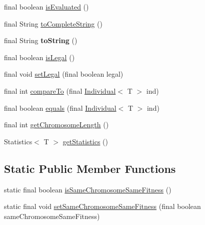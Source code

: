 \begin{DoxyCompactItemize}
\item 
final boolean \hyperlink{classjenes_1_1population_1_1_individual_3_01_t_01extends_01_chromosome_01_4_a90f222f30e37b23c0c3aceffd4571cfa}{is\-Evaluated} ()
\item 
final String \hyperlink{classjenes_1_1population_1_1_individual_3_01_t_01extends_01_chromosome_01_4_aeea71cba0872f34f4097e882b5debf64}{to\-Complete\-String} ()
\item 
\hypertarget{classjenes_1_1population_1_1_individual_3_01_t_01extends_01_chromosome_01_4_a705d4c4407ca6e33ae5b500fb192ced0}{final String {\bfseries to\-String} ()}\label{classjenes_1_1population_1_1_individual_3_01_t_01extends_01_chromosome_01_4_a705d4c4407ca6e33ae5b500fb192ced0}

\item 
final boolean \hyperlink{classjenes_1_1population_1_1_individual_3_01_t_01extends_01_chromosome_01_4_adcfca83cfc369ef8a3fcabe9bda4de1f}{is\-Legal} ()
\item 
final void \hyperlink{classjenes_1_1population_1_1_individual_3_01_t_01extends_01_chromosome_01_4_aabb4dbbc582544a12932ec7c42a2ec78}{set\-Legal} (final boolean legal)
\item 
final int \hyperlink{classjenes_1_1population_1_1_individual_3_01_t_01extends_01_chromosome_01_4_a4cc0f0feb3da7cc54bb44e881006d39a}{compare\-To} (final \hyperlink{classjenes_1_1population_1_1_individual_3_01_t_01extends_01_chromosome_01_4_aaef7161bf62cee0ac95f079394fdac9f}{Individual}$<$ T $>$ ind)
\item 
final boolean \hyperlink{classjenes_1_1population_1_1_individual_3_01_t_01extends_01_chromosome_01_4_acffe4b1590048fb780b637716fad6db6}{equals} (final \hyperlink{classjenes_1_1population_1_1_individual_3_01_t_01extends_01_chromosome_01_4_aaef7161bf62cee0ac95f079394fdac9f}{Individual}$<$ T $>$ ind)
\item 
final int \hyperlink{classjenes_1_1population_1_1_individual_3_01_t_01extends_01_chromosome_01_4_a78847299c79de4cde6aec341a406e80c}{get\-Chromosome\-Length} ()
\item 
Statistics$<$ T $>$ \hyperlink{classjenes_1_1population_1_1_individual_3_01_t_01extends_01_chromosome_01_4_acdf2d55195f6068913e5487b0542952a}{get\-Statistics} ()
\end{DoxyCompactItemize}
\subsection*{Static Public Member Functions}
\begin{DoxyCompactItemize}
\item 
static final boolean \hyperlink{classjenes_1_1population_1_1_individual_3_01_t_01extends_01_chromosome_01_4_adc6718949b2a065a657f0ac5e7aef664}{is\-Same\-Chromosome\-Same\-Fitness} ()
\item 
static final void \hyperlink{classjenes_1_1population_1_1_individual_3_01_t_01extends_01_chromosome_01_4_a1552d231f0bf2ebdba499e4575d2fa95}{set\-Same\-Chromosome\-Same\-Fitness} (final boolean same\-Chromosome\-Same\-Fitness)
\end{DoxyCompactItemize}
